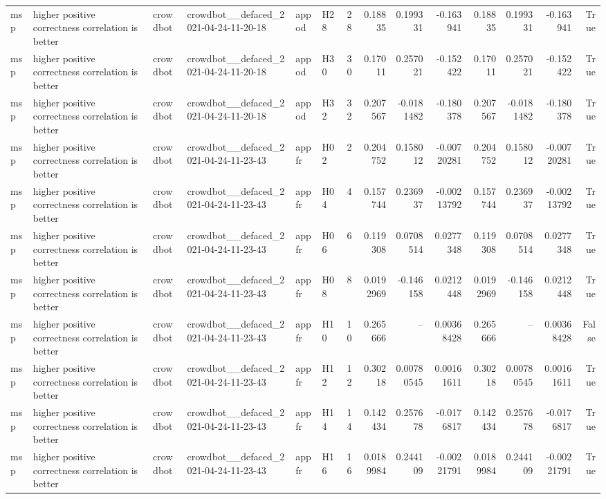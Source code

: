 \begin{longtable}{llllllrrrrrrrr}
msp & higher positive correctness correlation is better & crowdbot & crowdbot\_\_defaced\_2021-04-24-11-20-18 & appod & H28 & 28 & 0.18835 & 0.199331 & -0.163941 & 0.18835 & 0.199331 & -0.163941 & True \\
msp & higher positive correctness correlation is better & crowdbot & crowdbot\_\_defaced\_2021-04-24-11-20-18 & appod & H30 & 30 & 0.17011 & 0.257021 & -0.152422 & 0.17011 & 0.257021 & -0.152422 & True \\
msp & higher positive correctness correlation is better & crowdbot & crowdbot\_\_defaced\_2021-04-24-11-20-18 & appod & H32 & 32 & 0.207567 & -0.0181482 & -0.180378 & 0.207567 & -0.0181482 & -0.180378 & True \\
msp & higher positive correctness correlation is better & crowdbot & crowdbot\_\_defaced\_2021-04-24-11-23-43 & appfr & H02 & 2 & 0.204752 & 0.158012 & -0.00720281 & 0.204752 & 0.158012 & -0.00720281 & True \\
msp & higher positive correctness correlation is better & crowdbot & crowdbot\_\_defaced\_2021-04-24-11-23-43 & appfr & H04 & 4 & 0.157744 & 0.236937 & -0.00213792 & 0.157744 & 0.236937 & -0.00213792 & True \\
msp & higher positive correctness correlation is better & crowdbot & crowdbot\_\_defaced\_2021-04-24-11-23-43 & appfr & H06 & 6 & 0.119308 & 0.0708514 & 0.0277348 & 0.119308 & 0.0708514 & 0.0277348 & True \\
msp & higher positive correctness correlation is better & crowdbot & crowdbot\_\_defaced\_2021-04-24-11-23-43 & appfr & H08 & 8 & 0.0192969 & -0.146158 & 0.0212448 & 0.0192969 & -0.146158 & 0.0212448 & True \\
msp & higher positive correctness correlation is better & crowdbot & crowdbot\_\_defaced\_2021-04-24-11-23-43 & appfr & H10 & 10 & 0.265666 & -- & 0.00368428 & 0.265666 & -- & 0.00368428 & False \\
msp & higher positive correctness correlation is better & crowdbot & crowdbot\_\_defaced\_2021-04-24-11-23-43 & appfr & H12 & 12 & 0.30218 & 0.00780545 & 0.00161611 & 0.30218 & 0.00780545 & 0.00161611 & True \\
msp & higher positive correctness correlation is better & crowdbot & crowdbot\_\_defaced\_2021-04-24-11-23-43 & appfr & H14 & 14 & 0.142434 & 0.257678 & -0.0176817 & 0.142434 & 0.257678 & -0.0176817 & True \\
msp & higher positive correctness correlation is better & crowdbot & crowdbot\_\_defaced\_2021-04-24-11-23-43 & appfr & H16 & 16 & 0.0189984 & 0.244109 & -0.00221791 & 0.0189984 & 0.244109 & -0.00221791 & True \\

\end{longtable}
